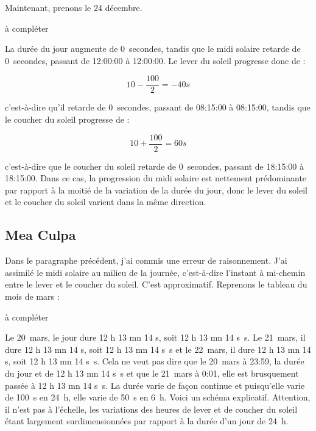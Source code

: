 \documentclass[a4paper]{article}
\newenvironment{texte}{\rmfamily}{}
\newcommand{\matable}{à compléter}
\newcommand{\veilaubehhmmss}[0]{08:15:00}
\newcommand{\veilmidihhmmss}[0]{12:00:00}
\newcommand{\veilsoirhhmmss}[0]{18:15:00}
\newcommand{\jouraubehhmmss}[0]{08:15:00}
\newcommand{\jourmidihhmmss}[0]{12:00:00}
\newcommand{\joursoirhhmmss}[0]{18:15:00}
\newcommand{\deltalumi}[0]{0}
\newcommand{\deltaaube}[0]{0}
\newcommand{\deltamidi}[0]{0}
\newcommand{\deltasoir}[0]{0}
\newcommand{\formuleaube}[0]{\[ 10 - \frac{100}{2} = -40 s \]}
\newcommand{\formulesoir}[0]{\[ 10 + \frac{100}{2} = 60 s \]}
\newcommand{\deltaveil}[0]{100}
\newcommand{\deltamatin}[0]{50}
\newcommand{\lgjveilmidihms}[0]{12 h 13 mn 14 s}
\newcommand{\lgjjourmidihms}[0]{12 h 13 mn 14 s}
\newcommand{\lgjlendmidihms}[0]{12 h 13 mn 14 s}
\newcommand{\lgjveilmidisec}[0]{12 h 13 mn 14 s}
\newcommand{\lgjjourmidisec}[0]{12 h 13 mn 14 s}
\newcommand{\lgjlendmidisec}[0]{12 h 13 mn 14 s}
\begin{document}
\begin{texte}
Maintenant, prenons le 24 décembre.

\vspace{2mm}
\matable
\vspace{2mm}

La durée du jour augmente de \deltalumi~secondes, tandis que le midi
solaire retarde de \deltamidi~secondes, passant de \veilmidihhmmss{} à \jourmidihhmmss.
Le lever du soleil progresse donc de :

\formuleaube{}

c'est-à-dire qu'il retarde de \deltaaube~secondes, passant
de \veilaubehhmmss{} à \jouraubehhmmss, tandis que le
coucher du soleil progresse de :

\formulesoir{}

c'est-à-dire que le coucher du soleil retarde de \deltasoir~secondes,
passant de \veilsoirhhmmss{} à \joursoirhhmmss{}.
Dans ce cas, la progression du midi solaire est nettement
prédominante par rapport à la moitié de la variation de la
durée du jour, donc le lever du soleil et le coucher
du soleil varient dans la même direction.

\vspace{5mm}

\subsection{Mea Culpa}

Dans le paragraphe précédent, j'ai commis une erreur de raisonnement.
J'ai assimilé le midi solaire au milieu de la journée, c'est-à-dire l'instant à mi-chemin entre
le lever et le coucher du soleil. C'est approximatif. Reprenons le
tableau du mois de mars :

\vspace{2mm}
\matable
\vspace{2mm}


Le 20~mars, le jour dure \lgjveilmidihms, soit \lgjveilmidisec~s.
Le 21~mars, il dure \lgjjourmidihms, soit \lgjjourmidisec~s
et le 22~mars, il dure \lgjlendmidihms, soit \lgjlendmidisec~s.
Cela ne veut pas dire que le 20~mars à 23:59, la durée
du jour et de \lgjveilmidisec~s et que le 21~mars à 0:01, elle est
brusquement passée à \lgjjourmidisec~s. La durée varie de façon continue
et puisqu'elle varie de \deltaveil~s en 24~h, elle varie de \deltamatin~s en 6~h.
Voici un schéma explicatif. Attention, il n'est pas à l'échelle, les variations
des heures de lever et de coucher du soleil étant largement surdimensionnées
par rapport à la durée d'un jour de 24~h.


\end{texte}
\end{document}
